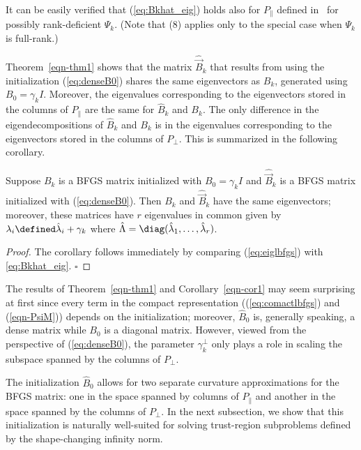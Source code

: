 \medskip

It can be easily verified that (\ref{eq:Bkhat_eig}) holds also for
$P_\parallel$ defined in~\cite{BurdakovLMTR16} for possibly
rank-deficient $\Psi_k$.  (Note that (8) 
applies only to the special case when $\Psi_k$ is full-rank.)

\medskip

Theorem~\ref{eqn-thm1} shows that the matrix $\widehat{\vec{B}}_k$ that results from using
the initialization (\ref{eq:denseB0}) shares the same eigenvectors as
$B_k$, generated using $B_0=\gamma_k I$.  Moreover, the eigenvalues
corresponding to the eigenvectors stored in the columns of $P_\parallel$
are the same for $\widehat{B}_k$ and $B_k$.  The only difference
in the eigendecompositions of $\widehat{B}_k$ and $B_k$ is in the
eigenvalues corresponding to the eigenvectors stored in the columns of
$P_\perp$.  This is summarized in the following corollary.

\begin{corollary}\label{eqn-cor1}
Suppose $B_k$ is a {\small BFGS} matrix initialized with
  $B_0=\gamma_kI$ and $\widehat{\vec{B}}_k$ is a {\small BFGS} matrix
  initialized with (\ref{eq:denseB0}).  Then $B_k$ and
  $\widehat{\vec{B}}_k$ have the same eigenvectors; moreover, these
  matrices have $r$ eigenvalues in common given by
  $\lambda_i\defined\hat{\lambda}_i+\gamma_k$ where $\hat{\Lambda}=\diag(
  \hat{\lambda}_1, \ldots, \hat{\lambda}_r)$.  \end{corollary} 
\begin{proof} The corollary
follows immediately by comparing (\ref{eq:eiglbfgs}) with \eqref{eq:Bkhat_eig}. $\square$
\end{proof}

\medskip

The results of Theorem~\ref{eqn-thm1} and Corollary~\ref{eqn-cor1} may seem surprising at
first since every term in the compact representation
((\ref{eq:comactlbfgs}) and (\ref{eqn-PsiM})) depends on the
initialization; moreover, $\widehat{B}_0$ is, generally speaking, a dense
matrix while $B_0$ is a diagonal matrix.  However, viewed from the
perspective of (\ref{eq:denseB0}), the parameter $\gamma^\perp_k$ only plays
a role in scaling the subspace spanned by the columns of $P_\perp$.

\medskip

The initialization $\widehat{B}_0$ allows for two separate curvature
approximations for the {\small BFGS} matrix: one in the space spanned by
columns of $P_\parallel$ and another in the space spanned by the columns of
$P_\perp$. 
In the next subsection, we show that this initialization 
is naturally well-suited for solving trust-region
subproblems defined by the shape-changing infinity norm.


